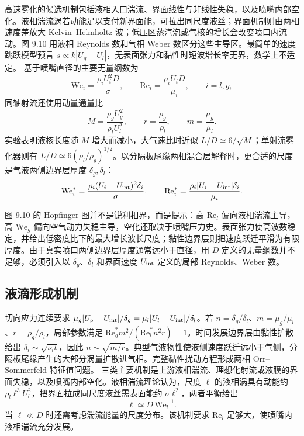 \documentclass[11pt,a4paper,openany,fontset=none]{ctexbook}
\begin{document}
高速雾化的候选机制包括液相入口湍流、界面线性与非线性失稳，以及喷嘴内部空化。液相湍流涡若动能足以支付新界面能，可拉出同尺度液丝；界面机制则由两相速度差放大 Kelvin--Helmholtz 波；低压区蒸汽泡或气核的增长会改变喷口内流动。图 9.10 用液相 Reynolds 数和气相 Weber 数区分这些主导区。最简单的速度跳跃模型预言 $s\propto k|U_g-U_l|$，无表面张力和黏性时短波增长率无界，数学上不适定。
基于喷嘴直径的主要无量纲数为
\begin{equation}
 \mathrm{We}_i=\frac{\rho_iU_i^2D}{\sigma},
 \qquad
 \mathrm{Re}_i=\frac{\rho_iU_iD}{\mu_i},
 \qquad i=l,g,
\end{equation}
同轴射流还使用动量通量比
\begin{equation}
 M=\frac{\rho_gU_g^2}{\rho_lU_l^2},
 \qquad r=\frac{\rho_g}{\rho_l},
 \qquad m=\frac{\mu_g}{\mu_l}.
\end{equation}
实验表明液核长度随 $M$ 增大而减小，大气速比时近似
$L/D\simeq6/\sqrt M$；单射流雾化器则有
$L/D\simeq6(\rho_l/\rho_g)^{1/2}$。以分隔板尾缘两相混合层解释时，更合适的尺度是气液两侧边界层厚度 $\delta_g,\delta_l$：
\begin{equation}
 \mathrm{We}_i^*=\frac{\rho_i(U_i-U_{\rm int})^2\delta_i}{\sigma},
 \qquad
 \mathrm{Re}_i^*=\frac{\rho_i|U_i-U_{\rm int}|\delta_i}{\mu_i}.
\end{equation}

图 9.10 的 Hopfinger 图并不是锐利相界，而是提示：高 $\mathrm{Re}_l$ 偏向液相湍流主导，高 $\mathrm{We}_g$ 偏向空气动力失稳主导，空化还取决于喷嘴压力史。表面张力使高波数稳定，并给出低密度比下的最大增长波长尺度；黏性边界层则把速度跃迁平滑为有限厚度。由于真实喷口两侧边界层厚度通常远小于直径，用 $D$ 定义的无量纲数并不足够，必须引入以 $\delta_g$、$\delta_l$ 和界面速度 $U_{\rm int}$ 定义的局部 Reynolds、Weber 数。
\subsection{液滴形成机制}

切向应力连续要求 $\mu_g|U_g-U_{\rm int}|/\delta_g=\mu_l|U_l-U_{\rm int}|/\delta_l$。若 $n=\delta_g/\delta_l$、$m=\mu_g/\mu_l$、$r=\rho_g/\rho_l$，局部参数满足 $\mathrm{Re}_g^*m^2/(\mathrm{Re}_l^*n^2r)=1$。时间发展边界层由黏性扩散给出 $\delta_i\sim\sqrt{\nu_it}$，因此 $n\sim\sqrt{m/r}$。典型气液物性使液侧速度跃迁远小于气侧，分隔板尾缘产生的大部分涡量扩散进气相。完整黏性扰动方程形成两相 Orr--Sommerfeld 特征值问题。
三类主要机制是上游液相湍流、理想化射流或液膜的界面失稳，以及喷嘴内部空化。液相湍流理论认为，尺度 $\ell$ 的液相涡具有动能约 $\rho_l\ell^3U_l^2$，把界面拉成同尺度液丝需表面能约 $\sigma\ell^2$，两者平衡给出
\begin{equation}
 \ell\simeq D\,\mathrm{We}_l^{-1}.
\end{equation}
当 $\ell\ll D$ 时还需考虑湍流能量的尺度分布。该机制要求 $\mathrm{Re}_l$ 足够大，使喷嘴内液相湍流充分发展。
\end{document}
